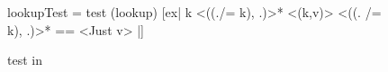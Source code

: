 \begin{figure}
    \begin{smallhskcode}
lookupTest = test (lookup)
            [ex| k { <((./= k), .)>* <(k,v)> <((. /= k), .)>* } == { <Just v> } |]
\end{smallhskcode}
    \caption{ test in \ourDSL}
    \label{fig:lookup-test}
\end{figure}